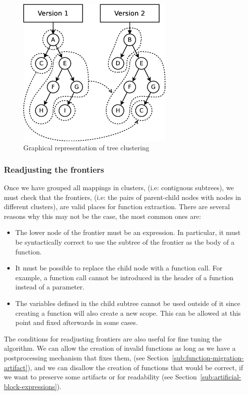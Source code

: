 \begin{figure}
\centering
\includegraphics[width=0.69\textwidth]{figures/automatic_beh_inf/diagrams/dia3}
\par

\caption{Graphical representation of tree clustering\label{fig:tree-clustering-example}}
\end{figure}



\subsubsection{Readjusting the frontiers}

Once we have grouped all mappings in clusters, (i.e: contiguous subtrees),
we must check that the frontiers, (i.e: the pairs of parent-child
nodes with nodes in different clusters), are valid places for function
extraction. There are several reasons why this may not be the case,
the most common ones are:
\begin{itemize}
\item The lower node of the frontier must be an expression. In particular,
it must be syntactically correct to use the subtree of the frontier
as the body of a function.
\item It must be possible to replace the child node with a function call.
For example, a function call cannot be introduced in the header of
a function instead of a parameter.
\item The variables defined in the child subtree cannot be used outside
of it since creating a function will also create a new scope. This
can be allowed at this point and fixed afterwards in some cases.
\end{itemize}
The conditions for readjusting frontiers are also useful for fine
tuning the algorithm. We can allow the creation of invalid functions
as long as we have a postprocessing mechanism that fixes them, (see
Section~\ref{sub:function-migration-artifact}), and we can disallow
the creation of functions that would be correct, if we want to preserve
some artifacts or for readability (see
Section~\ref{sub:artificial-block-expressions}).


